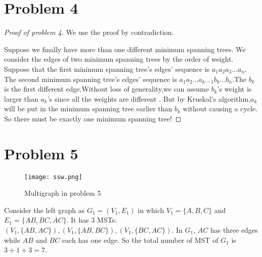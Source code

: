 \documentclass[paper=a4, fontsize=11pt]{scrartcl} %
\numberwithin{figure}{section} %
\numberwithin{table}{section} %
\begin{document}


\section*{Problem 4}

\begin{proof}[Proof of problem 4]
We use the proof by contradiction.

Suppose we finally have more than one different minimum spanning trees. We consider the edges of two minimum spanning trees by the order of weight. 
Suppose that the first minimum spanning tree's edges' sequence is $a_{1}$$a_{2}$$a_{3}$...$a_{n}$. The second minimum spanning tree's edges' sequence is $a_{1}$$a_{2}$...$a_{k-1}$$b_{k}$...$b_{n}$.The $b_k$ is the first different edge.Without loss of generality,we can assume $b_{k}$'s weight is larger than $a_{k}$'s since all the weights are different . But by Kruskal's algorithm,$a_{k}$ will be put in the minimum spanning tree earlier than $b_{k}$ without causing a cycle. So there must be exactly one minimum spanning tree!
\end{proof}



\section*{Problem 5}
\begin{figure}
\begin{center}
        \texttt{[image: ssw.png]}
        \caption{Multigraph in problem 5}
 \end{center}
\end{figure}
Consider the left graph as $G_1 = (V_1, E_1)$ in which $V_1 = \{A, B, C\}$ and $E_1 = \{AB, BC, AC\}$.
It has 3 MSTs: $(V_1, \{AB, AC\}), (V_1, \{AB, BC\}), (V_1, \{BC, AC\})$.
In $G_1$, $AC$ has three edges while $AB$ and $BC$ each has one edge. So the total number of MST of $G_1$ is $3 + 1 + 3 = 7$.
\end{document}
